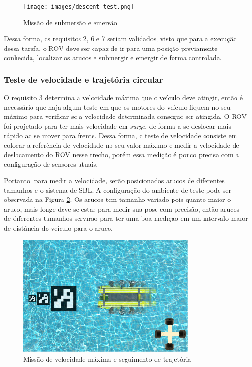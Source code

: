 \begin{figure}[h]
	\label{fig:descent-test}
	\caption{Missão de submersão e emersão}
	\centering
	\texttt{[image: images/descent\_test.png]}
\end{figure}

Dessa forma, os requisitos 2, 6 e 7 seriam validados, visto que para a execução dessa tarefa, o ROV deve ser capaz de ir para uma posição previamente conhecida, localizar os arucos e submergir e emergir de forma controlada.

\subsubsection*{Teste de velocidade e trajetória circular}

O requisito 3 determina a velocidade máxima que o veículo deve atingir, então é necessário que haja algum teste em que os motores do veículo fiquem no seu máximo para verificar se a velocidade determinada consegue ser atingida. O ROV foi projetado para ter mais velocidade em \textit{surge}, de forma a se deslocar mais rápido ao se mover para frente. Dessa forma, o teste de velocidade consiste em colocar a referência de velocidade no seu valor máximo e medir a velocidade de deslocamento do ROV nesse trecho, porém essa medição é pouco precisa com a configuração de sensores atuais.

Portanto, para medir a velocidade, serão posicionados arucos de diferentes tamanhos e o sistema de SBL. A configuração do ambiente de teste pode ser observada na Figura \ref{fig:speed-test}. Os arucos tem tamanho variado pois quanto maior o aruco, mais longe deve-se estar para medir sua pose com precisão, então arucos de diferentes tamanhos servirão para ter uma boa medição em um intervalo maior de distância do veículo para o aruco.

\begin{figure}[h]
	\label{fig:speed-test}
	\caption{Missão de velocidade máxima e seguimento de trajetória}
	\centering
	\includegraphics[width=0.8\textwidth]{images/speed_test.png}
\end{figure}

